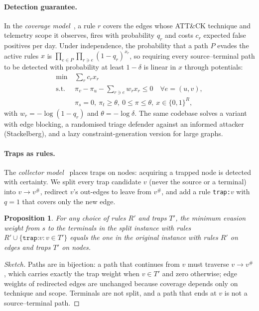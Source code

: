 \documentclass[10pt,twocolumn]{article}
\newtheorem{proposition}{Proposition}
\begin{document}
\paragraph{Detection guarantee.} In the \emph{coverage model}~\cite{detcover}, a rule $r$ covers the edges whose
ATT\&CK technique and telemetry scope it observes, fires with probability $q_r$ and costs
$c_r$ expected false positives per day. Under independence, the probability that a path
$P$ evades the active rules $x$ is $\prod_{e\in P}\prod_{r\ni e}(1-q_r)^{x_r}$, so
requiring every source--terminal path to be detected with probability at least $1-\delta$
is linear in $x$ through potentials:
\begin{align*}
\min\ & \textstyle\sum_r c_r x_r\\
\text{s.t. } & \pi_v-\pi_u-\textstyle\sum_{r\ni e} w_r x_r\le 0 \quad \forall e=(u,v),\\
& \pi_s=0,\ \pi_t\ge\theta,\ 0\le\pi\le\theta,\ x\in\{0,1\}^R,
\end{align*}
with $w_r=-\log(1-q_r)$ and $\theta=-\log\delta$. The same codebase solves a variant with
edge blocking, a randomised triage defender against an informed attacker (Stackelberg),
and a lazy constraint-generation version for large graphs.

\paragraph{Traps as rules.} The \emph{collector model}~\cite{periplo} places traps on nodes: acquiring a trapped node is
detected with certainty. We split every trap candidate $v$ (never the source or a
terminal) into $v\to v^{\#}$, redirect $v$'s out-edges to leave from $v^{\#}$, and add a
rule \texttt{trap:}$v$ with $q=1$ that covers only the new edge.

\begin{proposition}
For any choice of rules $R'$ and traps $T'$, the minimum evasion weight from $s$ to the
terminals in the split instance with rules $R'\cup\{\texttt{trap:}v: v\in T'\}$ equals the
one in the original instance with rules $R'$ on edges and traps $T'$ on nodes.
\end{proposition}
\begin{proof}[Sketch]
Paths are in bijection: a path that continues from $v$ must traverse $v\to v^{\#}$, which
carries exactly the trap weight when $v\in T'$ and zero otherwise; edge weights of
redirected edges are unchanged because coverage depends only on technique and scope.
Terminals are not split, and a path that ends at $v$ is not a source--terminal path.
\end{proof}
\end{document}

